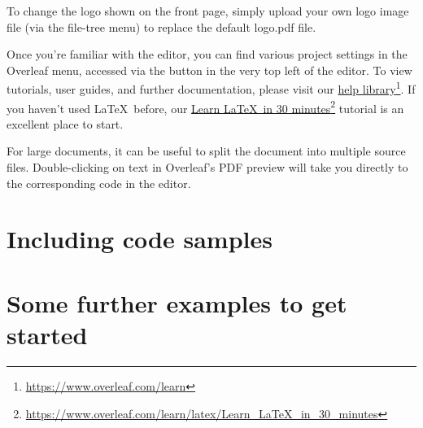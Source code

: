 \documentclass{ol-softwaremanual}
\newcommand{\doclink}[2]{\href{#1}{#2}\footnote{\url{#1}}}
\begin{document}
To change the logo shown on the front page, simply upload your own logo image file (via the file-tree menu) to replace the default logo.pdf file. 

Once you're familiar with the editor, you can find various project settings in the Overleaf menu, accessed via the button in the very top left of the editor. To view tutorials, user guides, and further documentation, please visit our \doclink{https://www.overleaf.com/learn}{help library}. If you haven't used \LaTeX\ before, our \doclink{https://www.overleaf.com/learn/latex/Learn_LaTeX_in_30_minutes}{Learn \LaTeX\ in 30 minutes} tutorial is an excellent place to start.

For large documents, it can be useful to split the document into multiple source files.
Double-clicking on text in Overleaf's PDF preview will take you directly to the corresponding code in the editor.

\section{Including code samples}



\section{Some further examples to get started}


\end{document}
